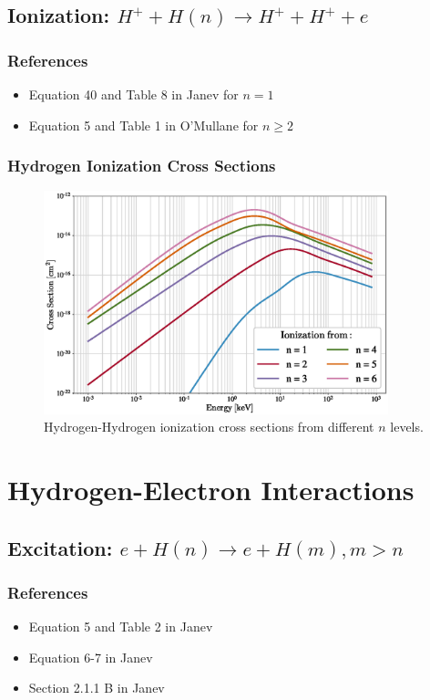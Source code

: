 \subsection{Ionization: $H^+ + H(n) \rightarrow H^+ + H^+ + e$}
\subsubsection{References}
\begin{itemize}
    \item Equation 40 and Table 8 in Janev\cite{janev2003collision} for $n=1$
    \item Equation 5 and Table 1 in O'Mullane\cite{omullane2009review} for $n\ge2$
\end{itemize}
\subsubsection{Hydrogen Ionization Cross Sections}
\begin{figure}[h!]
    \centering
    \includegraphics[width=10cm]{figures/tables/H_H_ioniz.eps}
    \caption{Hydrogen-Hydrogen ionization cross sections from different $n$ levels.}
    \label{fig:H_H_ioniz}
\end{figure}
\newpage

\section{Hydrogen-Electron Interactions}
\subsection{Excitation: $e + H(n) \rightarrow e + H(m), m > n$}
\subsubsection{References}
\begin{itemize}
    \item Equation 5 and Table 2 in Janev\cite{janev2003collision}
    \item Equation 6-7 in Janev\cite{janev2003collision}
    \item Section 2.1.1 B in Janev\cite{janev2003collision}
\end{itemize}
